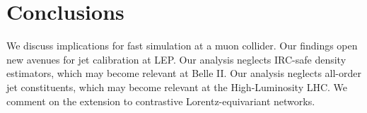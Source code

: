 \section{Conclusions}\label{sec:conclusions}

We discuss implications for fast simulation at a muon collider. Our
findings open new avenues for jet calibration at LEP. Our analysis
neglects IRC-safe density estimators, which may become relevant at Belle
II. Our analysis neglects all-order jet constituents, which may become
relevant at the High-Luminosity LHC. We comment on the extension to
contrastive Lorentz-equivariant networks.

